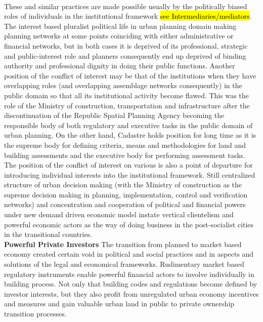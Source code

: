 \documentclass[11pt]{report}
\begin{document}
\\
These and similar practices are made possible usually by the politically biased roles of individuals in the institutional framework \hl{see Intermediaries/mediators}. The interest based pluralist political life in urban planning domain making planning networks at some points coinciding with either administrative or financial networks, but in both cases it is deprived of its professional, strategic and public-interest role and planners consequently end up deprived of binding authority and professional dignity in doing their public functions. Another position of the conflict of interest may be that of the institutions when they have overlapping roles (and overlapping assemblage networks consequently) in the public domain so that all its institutional activity become flawed. This was the role of the Ministry of construction, transportation and infrastructure after the discontinuation of the Republic Spatial Planning Agency becoming the responsible body of both regulatory and executive tasks in the public domain of urban planning. On the other hand, Cadastre holds position for long time as it is the supreme body for defining criteria, means and methodologies for land and building assessments and the executive body for performing assessment tasks. The position of the conflict of interest on various is also a point of departure for introducing individual interests into the institutional framework. Still centralized structure of urban decision making (with the Ministry of construction as the supreme decision making in planning, implementation, control and verification networks) and concentration and cooperation of political and financial powers under new demand driven economic model instate vertical clientelism and powerful economic actors as the way of doing business in the post-socialist cities in the transitional countries.
\\
\textbf{Powerful Private Investors}
The transition from planned to market based economy created certain void in political and social practices and in aspects and solutions of the legal and economical frameworks.
Rudimentary market based regulatory instruments enable powerful financial actors to involve individually in building process. Not only that building codes and regulations become defined by investor interests, but they also profit from unregulated urban economy incentives and measures and gain valuable urban land in public to private ownership transition processes.
\end{document}
